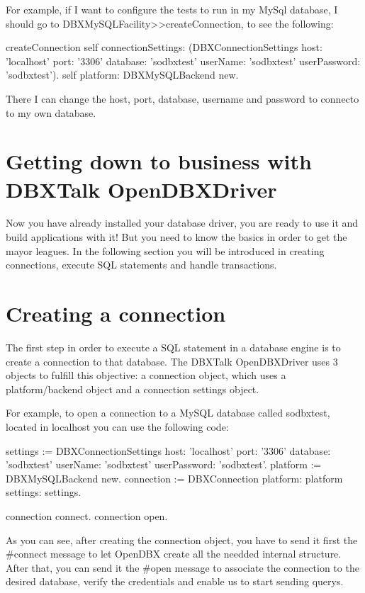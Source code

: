 \documentclass[a4paper,10pt,twoside]{book}
\begin{document}
For example, if I want to configure the tests to run in my MySql database, I should go to DBXMySQLFacility>>createConnection, to see the following:

\begin{code}{}
createConnection
    self connectionSettings: (DBXConnectionSettings
			    host: 'localhost'
			    port: '3306'
			    database: 'sodbxtest'
			    userName: 'sodbxtest'
			    userPassword: 'sodbxtest').
    self platform: DBXMySQLBackend new.
\end{code}

There I can change the host, port, database, username and password to connecto to my own database.

\section{Getting down to business with DBXTalk OpenDBXDriver}

Now you have already installed your database driver, you are ready to use it and build applications with it!  But you need to know the basics in order to get the mayor leagues.  In the following section you will be introduced in creating connections, execute SQL statements and handle transactions.

\section{Creating a connection}

The first step in order to execute a SQL statement in a database engine is to create a connection to that database.  The DBXTalk OpenDBXDriver uses 3 objects to fulfill this objective: a connection object, which uses a platform/backend object and a connection settings object.

For example, to open a connection to a MySQL database called sodbxtest, located in localhost you can use the following code:

\begin{code}{}
settings := DBXConnectionSettings
			host: 'localhost'
			port: '3306'
			database: 'sodbxtest'
			userName: 'sodbxtest'
			userPassword: 'sodbxtest'.
platform := DBXMySQLBackend new.
connection := DBXConnection platform: platform settings: settings.

connection connect.
connection open.
\end{code}

As you can see, after creating the connection object, you have to send it first the \#connect message to let OpenDBX create all the needded internal structure.  After that, you can send it the \#open message to associate the connection to the desired database, verify the credentials and enable us to start sending querys.
\end{document}
